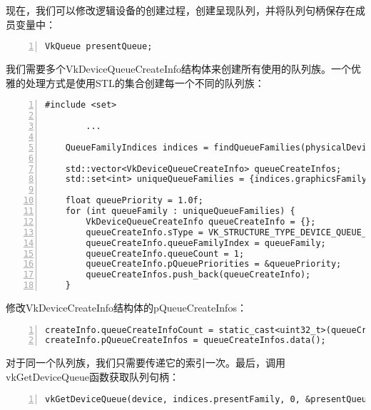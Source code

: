 \documentclass{ctexart}
\begin{document}
现在，我们可以修改逻辑设备的创建过程，创建呈现队列，并将队列句柄保存在成员变量中：

\begin{lstlisting}[language={[ANSI]C},keywordstyle=\color{blue!70},commentstyle=\color{red!50!green!50!blue!50},frame=shadowbox, rulesepcolor=\color{red!20!green!20!blue!20},basicstyle=\small,numbers=left, numberstyle=\tiny,breaklines=true]
VkQueue presentQueue;
\end{lstlisting}

我们需要多个VkDeviceQueueCreateInfo结构体来创建所有使用的队列族。一个优雅的处理方式是使用STL的集合创建每一个不同的队列族：

\begin{lstlisting}[language={[ANSI]C},keywordstyle=\color{blue!70},commentstyle=\color{red!50!green!50!blue!50},frame=shadowbox, rulesepcolor=\color{red!20!green!20!blue!20},basicstyle=\small,numbers=left, numberstyle=\tiny,breaklines=true]
#include <set>

		...

	QueueFamilyIndices indices = findQueueFamilies(physicalDevice);

	std::vector<VkDeviceQueueCreateInfo> queueCreateInfos;
	std::set<int> uniqueQueueFamilies = {indices.graphicsFamily, indices.presentFamily};

	float queuePriority = 1.0f;
	for (int queueFamily : uniqueQueueFamilies) {
		VkDeviceQueueCreateInfo queueCreateInfo = {};
		queueCreateInfo.sType = VK_STRUCTURE_TYPE_DEVICE_QUEUE_CREATE_INFO;
		queueCreateInfo.queueFamilyIndex = queueFamily;
		queueCreateInfo.queueCount = 1;
		queueCreateInfo.pQueuePriorities = &queuePriority;
		queueCreateInfos.push_back(queueCreateInfo);
	}
\end{lstlisting}

修改VkDeviceCreateInfo结构体的pQueueCreateInfos：

\begin{lstlisting}[language={[ANSI]C},keywordstyle=\color{blue!70},commentstyle=\color{red!50!green!50!blue!50},frame=shadowbox, rulesepcolor=\color{red!20!green!20!blue!20},basicstyle=\small,numbers=left, numberstyle=\tiny,breaklines=true]
createInfo.queueCreateInfoCount = static_cast<uint32_t>(queueCreateInfos.size());
createInfo.pQueueCreateInfos = queueCreateInfos.data();
\end{lstlisting}

对于同一个队列族，我们只需要传递它的索引一次。最后，调用vkGetDeviceQueue函数获取队列句柄：

\begin{lstlisting}[language={[ANSI]C},keywordstyle=\color{blue!70},commentstyle=\color{red!50!green!50!blue!50},frame=shadowbox, rulesepcolor=\color{red!20!green!20!blue!20},basicstyle=\small,numbers=left, numberstyle=\tiny,breaklines=true]
vkGetDeviceQueue(device, indices.presentFamily, 0, &presentQueue);
\end{lstlisting}
\end{document}
